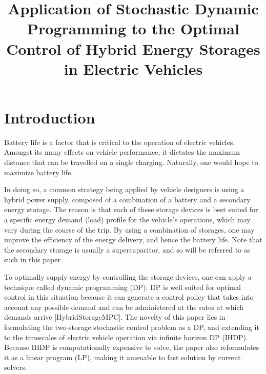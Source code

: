 \documentclass[conference]{IEEEtran}
\begin{document}
\title{Application of Stochastic Dynamic Programming to the Optimal Control of Hybrid Energy Storages in Electric Vehicles}

\author{
}


\maketitle


\section{Introduction}
Battery life is a factor that is critical to the operation of electric vehicles. Amongst its many effects on vehicle performance, it dictates the maximum distance that can be travelled on a single charging. Naturally, one would hope to maximize battery life.

In doing so, a common strategy being applied by vehicle designers is using a hybrid power supply, composed of a combination of a battery and a secondary energy storage. \cite{thounthong2009energy} The reason is that each of these storage devices is best suited for a specific energy demand (load) profile for the vehicle's operations, which may vary during the course of the trip. \cite{thounthong2009energy} By using a combination of storages, one may improve the efficiency of the energy delivery, and hence the battery life. Note that the secondary storage is usually a supercapacitor, and so will be referred to as such in this paper.

To optimally supply energy by controlling the storage devices, one can apply a technique called dynamic programming (DP). DP is well suited for optimal control in this situation because it can generate a control policy that takes into account any possible demand and can be administered at the rates at which demands arrive [HybridStorageMPC]. The novelty of this paper lies in formulating the two-storage stochastic control problem as a DP, and extending it to the timescales of electric vehicle operation via infinite horizon DP (IHDP). Because IHDP is computationally expensive to solve, the paper also reformulates it as a linear program (LP), making it amenable to fast solution by current solvers. 
\end{document}

